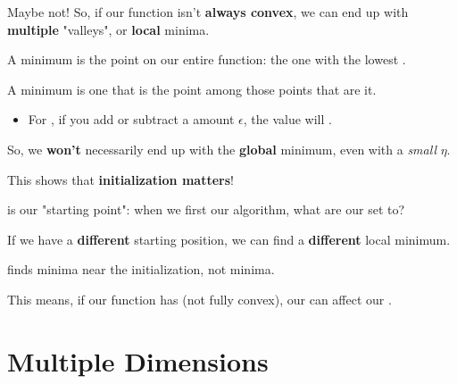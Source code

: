         Maybe not! So, if our function isn't \textbf{always convex}, we can end up with \textbf{multiple} "valleys", or \textbf{local} minima.\\
        
        \begin{definition}
            A  minimum is the  point on our entire function: the one with the lowest .
            
            A  minimum is one that is the  point among those points that are  it.
            
            \begin{itemize}
                \item For , if you add or subtract a  amount $\epsilon$, the value will .
            \end{itemize}
            
        \end{definition}
        
        So, we \textbf{won't} necessarily end up with the \textbf{global} minimum, even with a \textit{small} $\eta$.
        
        This shows that \textbf{initialization matters}!\\
        
        \begin{definition}
             is our "starting point": when we first  our algorithm, what are our  set to?
        \end{definition}
        
        If we have a \textbf{different} starting position, we can find a \textbf{different} local minimum.\\
        
        \begin{concept}
             finds  minima near the initialization, not  minima.
            
            This means, if our function has  (not fully convex), our  can affect our .
        \end{concept}

\pagebreak

\section{Multiple Dimensions}

